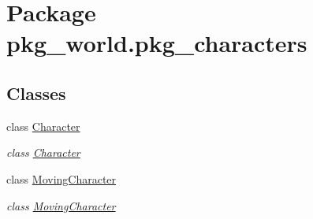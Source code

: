 \hypertarget{namespacepkg__world_1_1pkg__characters}{\section{Package pkg\-\_\-world.\-pkg\-\_\-characters}
\label{namespacepkg__world_1_1pkg__characters}
}
\subsection*{Classes}
\begin{DoxyCompactItemize}
\item 
class \hyperlink{classpkg__world_1_1pkg__characters_1_1Character}{Character}
\begin{DoxyCompactList}\small\item\em class \hyperlink{classpkg__world_1_1pkg__characters_1_1Character}{Character} \end{DoxyCompactList}\item 
class \hyperlink{classpkg__world_1_1pkg__characters_1_1MovingCharacter}{Moving\-Character}
\begin{DoxyCompactList}\small\item\em class \hyperlink{classpkg__world_1_1pkg__characters_1_1MovingCharacter}{Moving\-Character} \end{DoxyCompactList}\end{DoxyCompactItemize}
